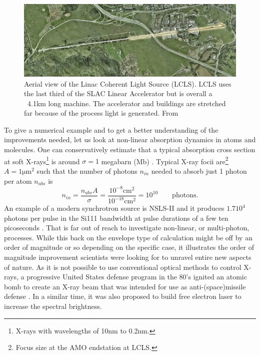 \begin{figure}[t]
	\centering
		\includegraphics[width=1.00\textwidth]{images/aerial-view-lcls.jpg}
	\caption[Aerial view of the Linac Coherent Light Source.]{Aerial view of the Linac Coherent Light Source (LCLS). LCLS uses the last third of the SLAC Linear Accelerator but is overall a ~4.1km long machine. The accelerator and buildings are stretched far because of the process light is generated. From \cite{SLAC-2009-Flickr}}
	\label{fig:aerial-view-lcls}
\end{figure}
To give a numerical example and to get a better understanding of the improvements needed, let us look at non-linear absorption dynamics in atoms and molecules. One can conservatively estimate that a typical absorption cross section at soft X-rays\footnote{X-rays with wavelengths of 10nm to 0.2nm.} is around $\sigma = 1$ megabarn (Mb) \cite{Bucksbaum-2011-Book}. Typical X-ray focii are\footnote{Focus size at the AMO endstation at LCLS.} $A = 1 \mathrm{\mu m}^{2}$ such that the number of photons $n_{in}$ needed to absorb just 1 photon per atom $n_{abs}$ is
\begin{equation}
n_{in} = \frac{n_{abs} A}{\sigma} = \frac{10^{-8} \mathrm{cm}^{2}}{10^{-18} \mathrm{cm}^{2}}=10^{10}\qquad \mathrm{photons.}
\label{eq:absorption-cross-section}
\end{equation}
An example of a modern synchrotron source is NSLS-II and it produces $1.7 10^{4}$ photons per pulse in the Si111 bandwidth at pulse durations of a few ten picoseconds \cite{Williams-2016-PC}. That is far out of reach to investigate non-linear, or multi-photon, processes. While this back on the envelope type of calculation might be off by an order of magnitude or so depending on the specific case, it illustrates the order of magnitude improvement scientists were looking for to unravel entire new aspects of nature. As it is not possible to use conventional optical methods to control X-rays, a progressive United States defense program in the 80's ignited an atomic bomb to create an X-ray beam that was intended for use as anti-(space)missile defense \cite{Hecht-2008-OPN}. In a similar time, it was also proposed to build free electron laser \cite{Kondratenko-1980-PA,Bonifacio-1984-OC} to increase the spectral brightness.
